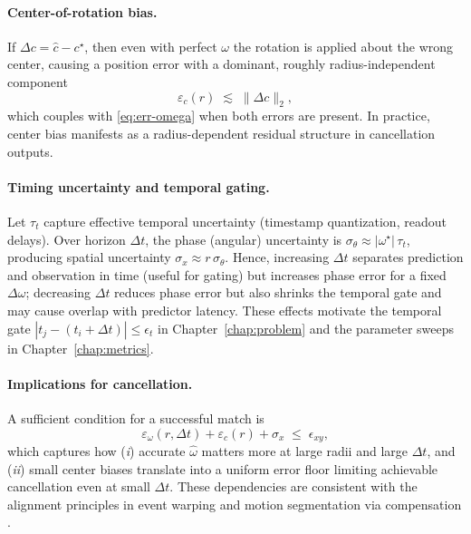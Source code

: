 \paragraph{Center-of-rotation bias.}
If $\Delta c = \hat c - c^\star$, then even with perfect $\omega$ the rotation is applied about the wrong center, causing a position error with a dominant, roughly radius-independent component
\begin{equation}
\varepsilon_c(r) \;\lesssim\; \|\Delta c\|_2,
\label{eq:err-center}
\end{equation}
which couples with \eqref{eq:err-omega} when both errors are present. In practice, center bias manifests as a radius-dependent residual structure in cancellation outputs.

\paragraph{Timing uncertainty and temporal gating.}
Let $\tau_t$ capture effective temporal uncertainty (timestamp quantization, readout delays). Over horizon $\Delta t$, the phase (angular) uncertainty is $\sigma_\theta \approx |\omega^\star|\,\tau_t$, producing spatial uncertainty $\sigma_x \approx r\,\sigma_\theta$. Hence, increasing $\Delta t$ separates prediction and observation in time (useful for gating) but increases phase error for a fixed $\Delta\omega$; decreasing $\Delta t$ reduces phase error but also shrinks the temporal gate and may cause overlap with predictor latency. These effects motivate the temporal gate $|t_j-(t_i+\Delta t)|\le \epsilon_t$ in Chapter~\ref{chap:problem} and the parameter sweeps in Chapter~\ref{chap:metrics}.

\paragraph{Implications for cancellation.}
A sufficient condition for a successful match is
\begin{equation}
\varepsilon_{\omega}(r,\Delta t) + \varepsilon_c(r) + \sigma_x \;\le\; \epsilon_{xy},
\label{eq:gate-sufficient}
\end{equation}
which captures how (\emph{i}) accurate $\hat\omega$ matters more at large radii and large $\Delta t$, and (\emph{ii}) small center biases translate into a uniform error floor limiting achievable cancellation even at small $\Delta t$. These dependencies are consistent with the alignment principles in event warping \cite{Gallego2018CMax} and motion segmentation via compensation \cite{Stoffregen2019Segmentation}.

